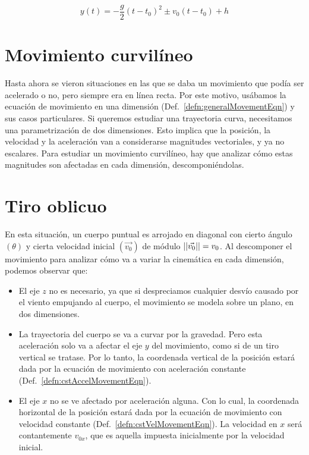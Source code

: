 \begin{mdframed}[style=DefinitionFrame]
    \begin{defn}
    \end{defn}
    \begin{equation*}
        y(t) = -\frac{g}{2}(t-t_0)^2 \pm v_0(t-t_0) + h
    \end{equation*}
\end{mdframed}


\section{Movimiento curvilíneo}

Hasta ahora se vieron situaciones en las que se daba un movimiento que podía ser acelerado o no, pero siempre era en línea recta.
Por este motivo, usábamos la ecuación de movimiento en una dimensión (Def.\ \ref{defn:generalMovementEqn}) y sus casos particulares.
Si queremos estudiar una trayectoria curva, necesitamos una parametrización de dos dimensiones.
Esto implica que la posición, la velocidad y la aceleración van a considerarse magnitudes vectoriales, y ya no escalares.
Para estudiar un movimiento curvilíneo, hay que analizar cómo estas magnitudes son afectadas en cada dimensión, descomponiéndolas.


\section{Tiro oblicuo}
\label{subsec:parabolicMotion}

En esta situación, un cuerpo puntual es arrojado en diagonal con cierto ángulo $(\theta)$ y cierta velocidad inicial $(\Vec{v_0})$ de módulo ${\left|\left| {\Vec{v_0}} \right|\right|} = v_0$.
Al descomponer el movimiento para analizar cómo va a variar la cinemática en cada dimensión, podemos observar que:
\begin{itemize}
    \item
    El eje $z$ no es necesario, ya que si despreciamos cualquier desvío causado por el viento empujando al cuerpo, el movimiento se modela sobre un plano, en dos dimensiones.
    
    \item
    La trayectoria del cuerpo se va a curvar por la gravedad.
    Pero esta aceleración solo va a afectar el eje $y$ del movimiento, como si de un tiro vertical se tratase.
    Por lo tanto, la coordenada vertical de la posición estará dada por la ecuación de movimiento con aceleración constante (Def.\ \ref{defn:cstAccelMovementEqn}).
    
    \item
    El eje $x$ no se ve afectado por aceleración alguna.
    Con lo cual, la coordenada horizontal de la posición estará dada por la ecuación de movimiento con velocidad constante (Def.\ \ref{defn:cstVelMovementEqn}).
    La velocidad en $x$ será contantemente $v_{0x}$, que es aquella impuesta inicialmente por la velocidad inicial.
\end{itemize}

